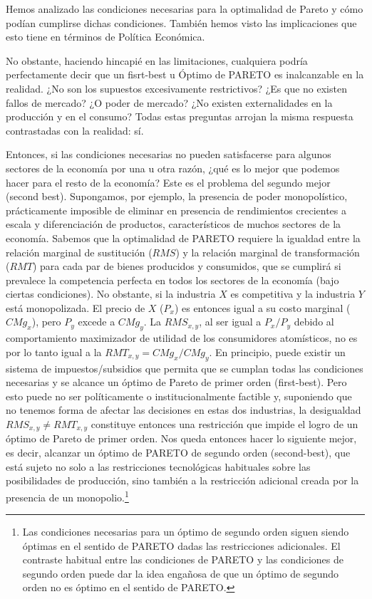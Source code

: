 \documentclass[10pt,a4paper]{article}
\begin{document}
Hemos analizado las condiciones necesarias para la optimalidad de Pareto y cómo podían cumplirse dichas condiciones. También hemos visto las implicaciones que esto tiene en términos de Política Económica.

No obstante, haciendo hincapié en las limitaciones, cualquiera podría perfectamente decir que un fisrt-best u Óptimo de PARETO es inalcanzable en la realidad. ¿No son los supuestos excesivamente restrictivos? ¿Es que no existen fallos de mercado? ¿O poder de mercado? ¿No existen externalidades en la producción y en el consumo? Todas estas preguntas arrojan la misma respuesta contrastadas con la realidad: sí. 

Entonces, si las condiciones necesarias no pueden satisfacerse para algunos sectores de la economía por una u otra razón, ¿qué es lo mejor que podemos hacer para el resto de la economía? Este es el problema del segundo mejor (second best). Supongamos, por ejemplo, la presencia de poder monopolístico, prácticamente imposible de eliminar en presencia de rendimientos crecientes a escala y diferenciación de productos, característicos de muchos sectores de la economía. Sabemos que la optimalidad de PARETO requiere la igualdad entre la relación marginal de sustitución (${RMS}$) y la relación marginal de transformación (${RMT}$) para cada par de bienes producidos y consumidos, que se cumplirá si prevalece la competencia perfecta en todos los sectores de la economía (bajo ciertas condiciones). No obstante, si la industria $X$ es competitiva y la industria $Y$ está monopolizada. El precio de $X$ ($P_x$) es entonces igual a su costo marginal (${CMg}_x$), pero $P_y$ excede a ${CMg}_y$. La $RMS_{x,y}$, al ser igual a $P_x/P_y$ debido al comportamiento maximizador de utilidad de los consumidores atomísticos, no es por lo tanto igual a la $RMT_{x,y}= {CMg}_x/{CMg}_y$. En principio, puede existir un sistema de impuestos/subsidios que permita que se cumplan todas las condiciones necesarias y se alcance un óptimo de Pareto de primer orden (first-best). Pero esto puede no ser políticamente o institucionalmente factible y, suponiendo que no tenemos forma de afectar las decisiones en estas dos industrias, la desigualdad ${RMS}_{x,y} \neq {RMT}_{x,y}$ constituye entonces una restricción que impide el logro de un óptimo de Pareto de primer orden. Nos queda entonces hacer lo siguiente mejor, es decir, alcanzar un óptimo de PARETO de segundo orden (second-best), que está sujeto no solo a las restricciones tecnológicas habituales sobre las posibilidades de producción, sino también a la restricción adicional creada por la presencia de un monopolio.\footnote{%
    Las condiciones necesarias para un óptimo de segundo orden siguen siendo óptimas en el sentido de PARETO dadas las restricciones adicionales. El contraste habitual entre las condiciones de PARETO y las condiciones de segundo orden puede dar la idea engañosa de que un óptimo de segundo orden no es óptimo en el sentido de PARETO.
}
\end{document}
